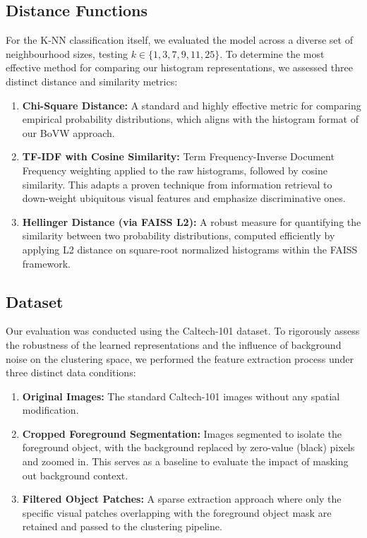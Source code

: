 \documentclass[oneside]{ctuthesis}
\begin{document}
\subsection{Distance Functions}
\label{sec:knn_classification_distance_functions}
For the K-NN classification itself, we evaluated the model across a diverse set of neighbourhood sizes, testing $k \in \{1, 3, 7, 9, 11, 25\}$. To determine the most effective method for comparing our histogram representations, we assessed three distinct distance and similarity metrics:
\begin{enumerate}
    \item \textbf{Chi-Square Distance:} A standard and highly effective metric for comparing empirical probability distributions, which aligns with the histogram format of our BoVW approach.
    \item \textbf{TF-IDF with Cosine Similarity:} Term Frequency-Inverse Document Frequency weighting applied to the raw histograms, followed by cosine similarity. This adapts a proven technique from information retrieval to down-weight ubiquitous visual features and emphasize discriminative ones.
    \item \textbf{Hellinger Distance (via FAISS L2):} A robust measure for quantifying the similarity between two probability distributions, computed efficiently by applying L2 distance on square-root normalized histograms within the FAISS framework.
\end{enumerate}

\subsection{Dataset}
\label{sec:knn_classification_dataset}
Our evaluation was conducted using the Caltech-101 dataset. To rigorously assess the robustness of the learned representations and the influence of background noise on the clustering space, we performed the feature extraction process under three distinct data conditions:

\begin{enumerate}
    \item \textbf{Original Images:} The standard Caltech-101 images without any spatial modification.
    \item \textbf{Cropped Foreground Segmentation:} Images segmented to isolate the foreground object, with the background replaced by zero-value (black) pixels and zoomed in. This serves as a baseline to evaluate the impact of masking out background context.
    \item \textbf{Filtered Object Patches:} A sparse extraction approach where only the specific visual patches overlapping with the foreground object mask are retained and passed to the clustering pipeline.
\end{enumerate}
\end{document}
